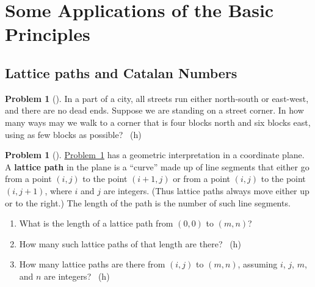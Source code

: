 \documentclass[10pt,]{book}
\newcommand{\terminology}[1]{\textbf{#1}}
\theoremstyle{plain}
\theoremstyle{definition}
\newtheorem{activity}[project]{Problem}
\theoremstyle{definition}
\numberwithin{equation}{chapter}
\begin{document}
\section[{Some Applications of the Basic Principles}]{Some Applications of the Basic Principles}\label{s1-3-apps}
\typeout{************************************************}
\typeout{************************************************}
\subsection[{Lattice paths and Catalan Numbers}]{Lattice paths and Catalan Numbers}\label{subsection-7}
\begin{activity}[] \label{blockwalking}
\hypertarget{p-269}{}%
In a part of a city, all streets run either north-south or east-west, and there are no dead ends. Suppose we are standing on a street corner. In how many ways may we walk to a corner that is four blocks north and six blocks east, using as few blocks as possible?%
~{\tiny (h)}\end{activity}
\begin{activity}[] \label{latticepaths}
\hypertarget{p-272}{}%
\hyperref[blockwalking]{Problem~\ref{blockwalking}} has a geometric interpretation in a coordinate plane. A \terminology{lattice path} in the plane is a ``curve'' made up of line segments that either go from a point \((i,j)\) to the point \((i+1,j)\) or from a point \((i,j)\) to the point \((i,j+1)\), where \(i\) and \(j\) are integers. (Thus lattice paths always move either up or to the right.) The length of the path is the number of such line segments.%
\begin{enumerate}[font=\bfseries,label=(\alph*),ref=\alph*]
\item\label{task-47} \marginsymbol[-2.5em]{} \hypertarget{p-273}{}%
What is the length of a lattice path from \((0,0)\) to \((m,n)\)?%
\item\label{task-48} \marginsymbol[-2.5em]{} \hypertarget{p-275}{}%
How many such lattice paths of that length are there?%
~{\tiny (h)}\item\label{task-49} \marginsymbol[-2.5em]{} \hypertarget{p-278}{}%
How many lattice paths are there from \((i,j)\) to \((m,n)\), assuming \(i\), \(j\), \(m\), and \(n\) are integers?%
~{\tiny (h)}\end{enumerate}
\end{activity}
\end{document}
